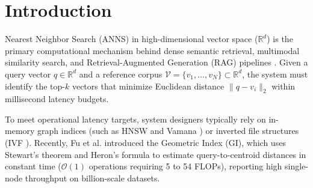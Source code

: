 \documentclass[11pt,journal,compsoc,onecolumn]{IEEEtran}
\begin{document}
\maketitle
\IEEEdisplaynontitleabstractindextext
\IEEEpeerreviewmaketitle

\section{Introduction}
 Nearest Neighbor Search (ANNS) in high-dimensional vector space ($\mathbb{R}^d$) is the primary computational mechanism behind dense semantic retrieval, multimodal similarity search, and Retrieval-Augmented Generation (RAG) pipelines \cite{johnson2021billion, reimers2019sentencebert}. Given a query vector $q \in \mathbb{R}^d$ and a reference corpus $\mathcal{V} = \{v_1, \dots, v_N\} \subset \mathbb{R}^d$, the system must identify the top-$k$ vectors that minimize Euclidean distance $\|q - v_i\|_2$ within millisecond latency budgets.

To meet operational latency targets, system designers typically rely on in-memory graph indices (such as HNSW \cite{malkov2020efficient} and Vamana \cite{subramanya2019diskann}) or inverted file structures (IVF \cite{jegou2011product}). Recently, Fu et al. \cite{fu2026geometric} introduced the Geometric Index (GI), which uses Stewart's theorem and Heron's formula to estimate query-to-centroid distances in constant time ($\mathcal{O}(1)$ operations requiring 5 to 54 FLOPs), reporting high single-node throughput on billion-scale datasets.
\end{document}
